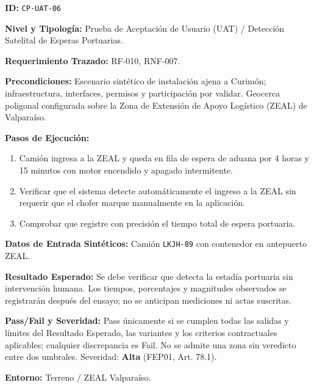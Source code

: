 \par\noindent\textbf{ID:} \texttt{C\allowbreak{}P\allowbreak{}-\allowbreak{}U\allowbreak{}A\allowbreak{}T\allowbreak{}-\allowbreak{}0\allowbreak{}6\allowbreak{}}\par
\par\noindent\textbf{Nivel y Tipología:} Prueba de Aceptación de Usuario (UAT) / Detección Satelital de Esperas Portuarias.\par
\par\noindent\textbf{Requerimiento Trazado:} RF-010, RNF-007.\par
\par\noindent\textbf{Precondiciones:} Escenario sintético de instalación ajena a Curimón; infraestructura, interfaces, permisos y participación por validar.  Geocerca poligonal configurada sobre la Zona de Extensión de Apoyo Logístico (ZEAL) de Valparaíso.\par
\par\noindent\textbf{Pasos de Ejecución:} \par
\begin{enumerate}
\item Camión ingresa a la ZEAL y queda en fila de espera de aduana por 4 horas y 15 minutos con motor encendido y apagado intermitente.
\item Verificar que el sistema detecte automáticamente el ingreso a la ZEAL sin requerir que el chofer marque manualmente en la aplicación.
\item Comprobar que registre con precisión el tiempo total de espera portuaria.
\end{enumerate}
\par\noindent\textbf{Datos de Entrada Sintéticos:} Camión \texttt{L\allowbreak{}K\allowbreak{}J\allowbreak{}H\allowbreak{}-\allowbreak{}8\allowbreak{}9\allowbreak{}} con contenedor en antepuerto ZEAL.\par
\par\noindent\textbf{Resultado Esperado:} Se debe verificar que detecta la estadía portuaria sin intervención humana. Los tiempos, porcentajes y magnitudes observados se registrarán después del ensayo; no se anticipan mediciones ni actas suscritas.\par
\par\noindent\textbf{Pass/Fail y Severidad:} Pass únicamente si se cumplen todas las salidas y límites del Resultado Esperado, las variantes y los criterios contractuales aplicables; cualquier discrepancia es Fail. No se admite una zona sin veredicto entre dos umbrales. Severidad: \textbf{Alta} (FEP01, Art. 78.1).\par
\par\noindent\textbf{Entorno:} Terreno / ZEAL Valparaíso.\par






